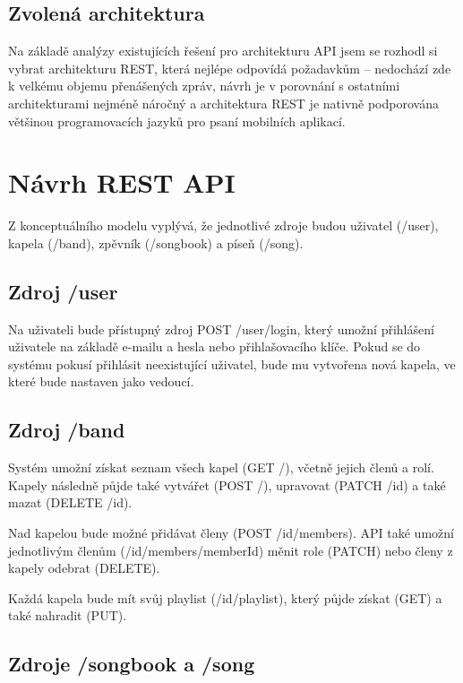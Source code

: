 \subsection{Zvolená architektura}

Na základě analýzy existujících řešení pro architekturu API jsem se rozhodl si vybrat architekturu REST, která nejlépe odpovídá požadavkům -- nedochází zde k velkému objemu přenášených zpráv, návrh je v porovnání s ostatními architekturami nejméně náročný a architektura REST je nativně podporována většinou programovacích jazyků pro psaní mobilních aplikací.

\section{Návrh REST API}

Z konceptuálního modelu vyplývá, že jednotlivé zdroje budou uživatel (/user), kapela (/band), zpěvník (/songbook) a píseň (/song).

\subsection{Zdroj /user}

Na uživateli bude přístupný zdroj POST /user/login, který umožní přihlášení uživatele na základě e-mailu a hesla nebo přihlašovacího klíče. Pokud se do systému pokusí přihlásit neexistující uživatel, bude mu vytvořena nová kapela, ve které bude nastaven jako vedoucí.

\subsection{Zdroj /band}

Systém umožní získat seznam všech kapel (GET /), včetně jejich členů a rolí. Kapely následně půjde také vytvářet (POST /), upravovat (PATCH /id) a také mazat (DELETE /id).

Nad kapelou bude možné přidávat členy (POST /id/members). API také umožní jednotlivým členům (/id/members/memberId) měnit role (PATCH) nebo členy z kapely odebrat (DELETE).

Každá kapela bude mít svůj playlist (/id/playlist), který půjde získat (GET) a také nahradit (PUT).

\subsection{Zdroje /songbook a /song}

